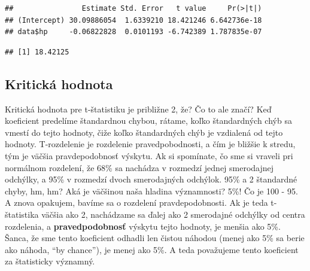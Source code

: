 \documentclass[]{article}
\newenvironment{Shaded}{\begin{snugshade}}{\end{snugshade}}
\newcommand{\CommentTok}[1]{\textcolor[rgb]{0.56,0.35,0.01}{\textit{#1}}}
\newcommand{\DecValTok}[1]{\textcolor[rgb]{0.00,0.00,0.81}{#1}}
\newcommand{\KeywordTok}[1]{\textcolor[rgb]{0.13,0.29,0.53}{\textbf{#1}}}
\newcommand{\NormalTok}[1]{#1}
\newcommand{\OperatorTok}[1]{\textcolor[rgb]{0.81,0.36,0.00}{\textbf{#1}}}
\newcommand{\StringTok}[1]{\textcolor[rgb]{0.31,0.60,0.02}{#1}}
\begin{document}
\begin{verbatim}
##                Estimate Std. Error   t value     Pr(>|t|)
## (Intercept) 30.09886054  1.6339210 18.421246 6.642736e-18
## data$hp     -0.06822828  0.0101193 -6.742389 1.787835e-07
\end{verbatim}

\begin{Shaded}
\end{Shaded}

\begin{verbatim}
## [1] 18.42125
\end{verbatim}

\hypertarget{kritickuxe1-hodnota}{%
\subsection{Kritická hodnota}\label{kritickuxe1-hodnota}}

Kritická hodnota pre t-štatistiku je približne 2, že? Čo to ale značí?
Keď koeficient predelíme štandardnou chybou, rátame, koľko štandardných
chýb sa vmestí do tejto hodnoty, čiže koľko štandardných chýb je
vzdialená od tejto hodnoty. T-rozdelenie je rozdelenie pravedpobodnosti,
a čím je bližšie k stredu, tým je väčšia pravdepodobnosť výskytu. Ak si
spomínate, čo sme si vraveli pri normálnom rozdelení, že 68\% sa
nachádza v rozmedzí jednej smerodajnej odchýlky, a 95\% v rozmedzí dvoch
smerodajných odchýlok. 95\% a 2 štandardné chyby, hm, hm? Aká je
väčšinou naša hladina významnosti? 5\%! Čo je 100 - 95. A znova
opakujem, bavíme sa o rozdelení pravdepodobnosti. Ak je teda
t-štatistika väčšia ako 2, nachádzame sa ďalej ako 2 smerodajné odchýlky
od centra rozdelenia, a \textbf{pravedpodobnosť} výskytu tejto hodnoty,
je menšia ako 5\%. Šanca, že sme tento koeficient odhadli len čistou
náhodou (menej ako 5\% sa berie ako náhoda, ``by chance''), je menej ako
5\%. A teda považujeme tento koeficient za štatisticky významný.
\end{document}

